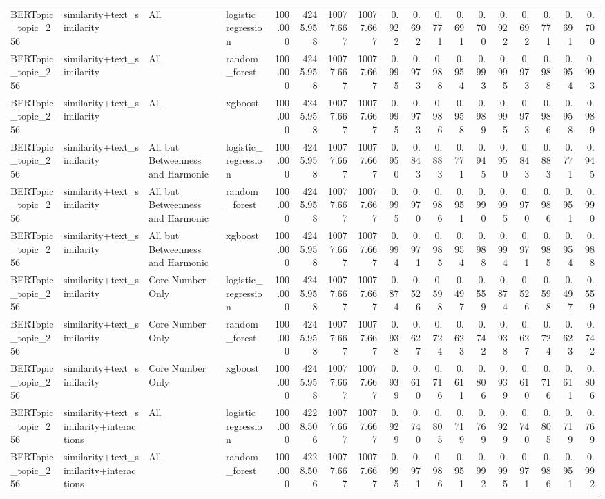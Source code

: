 \begin{tabular}{llllrrrrrrrrrrrrrr}
BERTopic_topic_256 & similarity+text_similarity & All & logistic_regression & 100.000 & 4245.958 & 10077.667 & 10077.667 & 0.922 & 0.692 & 0.771 & 0.691 & 0.700 & 0.922 & 0.692 & 0.771 & 0.691 & 0.700 \\
BERTopic_topic_256 & similarity+text_similarity & All & random_forest & 100.000 & 4245.958 & 10077.667 & 10077.667 & 0.995 & 0.973 & 0.988 & 0.954 & 0.993 & 0.995 & 0.973 & 0.988 & 0.954 & 0.993 \\
BERTopic_topic_256 & similarity+text_similarity & All & xgboost & 100.000 & 4245.958 & 10077.667 & 10077.667 & 0.995 & 0.973 & 0.986 & 0.958 & 0.989 & 0.995 & 0.973 & 0.986 & 0.958 & 0.989 \\
BERTopic_topic_256 & similarity+text_similarity & All but Betweenness and Harmonic & logistic_regression & 100.000 & 4245.958 & 10077.667 & 10077.667 & 0.950 & 0.843 & 0.883 & 0.771 & 0.945 & 0.950 & 0.843 & 0.883 & 0.771 & 0.945 \\
BERTopic_topic_256 & similarity+text_similarity & All but Betweenness and Harmonic & random_forest & 100.000 & 4245.958 & 10077.667 & 10077.667 & 0.995 & 0.970 & 0.986 & 0.951 & 0.990 & 0.995 & 0.970 & 0.986 & 0.951 & 0.990 \\
BERTopic_topic_256 & similarity+text_similarity & All but Betweenness and Harmonic & xgboost & 100.000 & 4245.958 & 10077.667 & 10077.667 & 0.994 & 0.971 & 0.985 & 0.954 & 0.988 & 0.994 & 0.971 & 0.985 & 0.954 & 0.988 \\
BERTopic_topic_256 & similarity+text_similarity & Core Number Only & logistic_regression & 100.000 & 4245.958 & 10077.667 & 10077.667 & 0.874 & 0.526 & 0.598 & 0.497 & 0.559 & 0.874 & 0.526 & 0.598 & 0.497 & 0.559 \\
BERTopic_topic_256 & similarity+text_similarity & Core Number Only & random_forest & 100.000 & 4245.958 & 10077.667 & 10077.667 & 0.938 & 0.627 & 0.724 & 0.623 & 0.742 & 0.938 & 0.627 & 0.724 & 0.623 & 0.742 \\
BERTopic_topic_256 & similarity+text_similarity & Core Number Only & xgboost & 100.000 & 4245.958 & 10077.667 & 10077.667 & 0.939 & 0.610 & 0.716 & 0.611 & 0.806 & 0.939 & 0.610 & 0.716 & 0.611 & 0.806 \\
BERTopic_topic_256 & similarity+text_similarity+interactions & All & logistic_regression & 100.000 & 4228.506 & 10077.667 & 10077.667 & 0.929 & 0.740 & 0.805 & 0.719 & 0.769 & 0.929 & 0.740 & 0.805 & 0.719 & 0.769 \\
BERTopic_topic_256 & similarity+text_similarity+interactions & All & random_forest & 100.000 & 4228.506 & 10077.667 & 10077.667 & 0.995 & 0.971 & 0.986 & 0.951 & 0.992 & 0.995 & 0.971 & 0.986 & 0.951 & 0.992 \\

\end{tabular}
